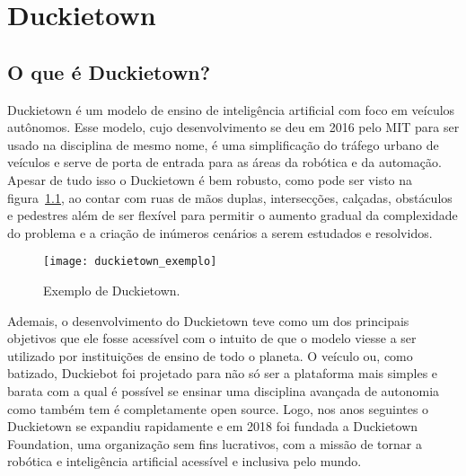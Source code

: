 

\chapter{Duckietown}
\label{cap:duckietown}

\section{O que é Duckietown?}
\label{sec:o-que-e-duckietown}

\enlargethispage{.5\baselineskip}

Duckietown é um modelo de ensino de inteligência artificial com foco em veículos autônomos. Esse modelo, cujo desenvolvimento se deu em 2016 pelo MIT para ser usado na disciplina de mesmo nome, é uma simplificação do tráfego urbano de veículos e serve de porta de entrada para as áreas da robótica e da automação. Apesar de tudo isso o Duckietown é bem robusto, como pode ser visto na figura~\ref{fig:duckietown_exemplo}, ao contar com ruas de mãos duplas, intersecções, calçadas, obstáculos e pedestres além de ser flexível para permitir o aumento gradual da complexidade do problema e a criação de inúmeros cenários a serem estudados e resolvidos.

\begin{figure}
	\centering
	\texttt{[image: duckietown\_exemplo]}
	\caption{Exemplo de Duckietown.\label{fig:duckietown_exemplo}}
\end{figure}

Ademais, o desenvolvimento do Duckietown teve como um dos principais objetivos que ele fosse acessível com o intuito de que o modelo viesse a ser utilizado por instituições de ensino de todo o planeta. O veículo ou, como batizado, Duckiebot foi projetado para não só ser a plataforma mais simples e barata com a qual é possível se ensinar uma disciplina avançada de autonomia como também tem é completamente open source. Logo, nos anos seguintes o Duckietown se expandiu rapidamente e em 2018 foi fundada a Duckietown Foundation, uma organização sem fins lucrativos, com a missão de tornar a robótica e inteligência artificial acessível e inclusiva pelo mundo. 

